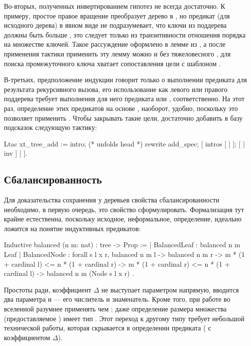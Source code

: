 \documentclass[a4paper,14pt]{extarticle}
\begin{document}
Во-вторых, полученных инвертированием гипотез не всегда достаточно. 
К примеру, простое правое вращение преобразует дерево
 в ,
но предикат  (для исходного дерева)
в явном виде не подразумевает,
что ключи из поддерева  должны быть больше ,
это следует только из транзитивности отношения порядка на множестве ключей.
Такое рассуждение оформлено в лемме
 из ,
а после применения тактики 
применить эту лемму можно и без тяжеловесного ,
для поиска промежуточного ключа хватает сопоставления цели с шаблоном
.

В-третьих, предположение индукции говорит только
о выполнении предиката 
для результата рекурсивного вызова,
его использование как левого или правого поддерева требует
выполнения для него предиката  или ,
соответственно.
На этот раз, определение этих предикатов на основе ,
наоборот, удобно, поскольку это позволяет применить .
Чтобы закрывать такие цели, достаточно добавить в базу подсказок 
следующую тактику:
\begin{coqcode}
Ltac xt_tree_add :=
  intro; (* unfolds head *)
  rewrite add_spec;
  [ intros [ | ]; [ | inv ] | ].
\end{coqcode}

\subsection{Сбалансированность}

Для доказательства сохранения у деревьев
свойства сбалансированности необходимо, в первую очередь,
это свойство сформулировать.
Формализация тут крайне естественна,
поскольку исходное, неформальное, определение,
идеально ложится на понятие индуктивных предикатов:
\begin{coqcode}
Inductive balanced (n m: nat) : tree -> Prop :=
  | BalancedLeaf : balanced n m Leaf
  | BalancedNode : forall s l x r,
      balanced n m l -> balanced n m r ->
      m * (1 + cardinal l) <= n * (1 + cardinal r) ->
      m * (1 + cardinal r) <= n * (1 + cardinal l) ->
      balanced n m (Node s l x r)
.
\end{coqcode}

Простоты ради, коэффициент \( \Delta \)
не выступает параметром напрямую,
вводится  два параметра  и  ---
его числитель и знаменатель.
Кроме того, при работе во вселенной 
разумнее применять  чем ;
даже определение размера множества 
(предоставляемое )
имеет тип .
Этот переход к другому типу требует небольшой технической
работы, которая скрывается в определении
предиката 
( с коэффициентом \( \Delta \)).
\end{document}

